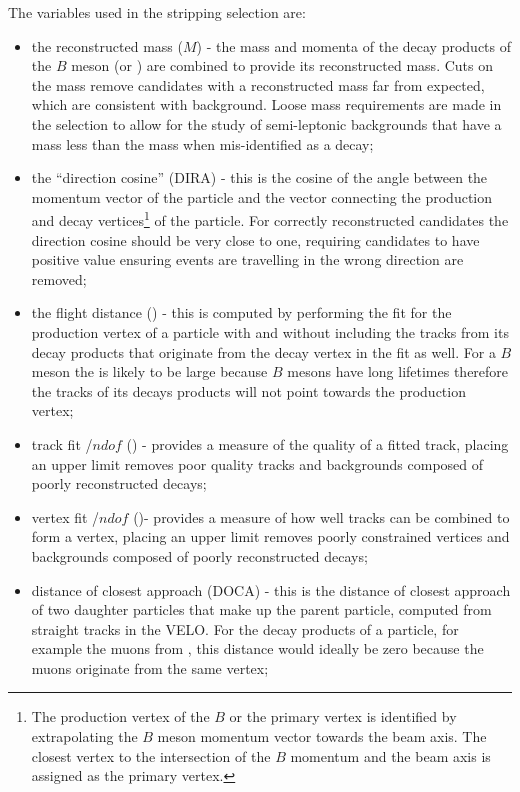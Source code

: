 The variables used in the stripping selection are:
\begin{itemize}
\item the reconstructed mass ($M$) - the mass and momenta of the decay products of the $B$ meson (or \jpsi) are combined to provide its reconstructed mass. Cuts on the mass remove candidates with a reconstructed mass far from expected, which are consistent with background. Loose mass requirements are made in the \bmumu selection to allow for the study of semi-leptonic backgrounds that have a mass less than the \bsd mass when mis-identified as a \bmumu decay;
\item the ``direction cosine'' (DIRA) - this is the cosine of the angle between the momentum vector of the particle and the vector connecting the production and decay vertices\footnote{The production vertex of the $B$ or the primary vertex is identified by extrapolating the $B$ meson momentum vector towards the beam axis. The closest vertex to the intersection of the $B$ momentum and the beam axis is assigned as the primary vertex.} of the particle. For correctly reconstructed candidates the direction cosine should be very close to one, requiring candidates to have positive value ensuring events are travelling in the wrong direction are removed;
\item the flight distance (\chiFD) - this is computed by performing the fit for the production vertex of a particle with and without including the tracks from its decay products that originate from the decay vertex in the fit as well. For a $B$ meson the \chiFD is likely to be large because $B$ mesons have long lifetimes therefore the tracks of its decays products will not point towards the production vertex;
\item track fit \chisqd/$ndof$ (\chitrk) - provides a measure of the quality of a fitted track, placing an upper limit removes poor quality tracks and backgrounds composed of poorly reconstructed decays;
\item vertex fit \chisqd/$ndof$ (\chivtx)- provides a measure of how well tracks can be combined to form a vertex, placing an upper limit removes poorly constrained vertices and backgrounds composed of poorly reconstructed decays;
\item distance of closest approach (DOCA) - this is the distance of closest approach of two daughter particles that make up the parent particle, computed from straight tracks in the VELO. For the decay products of a particle, for example the muons from \bmumu, this distance would ideally be zero because the muons originate from the same vertex;

\end{itemize}
